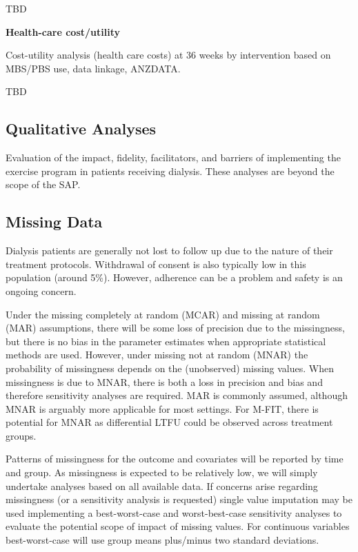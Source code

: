 \documentclass[
]{article}
\begin{document}
TBD

\textbf{Health-care cost/utility}

Cost-utility analysis (health care costs) at 36 weeks by intervention based on MBS/PBS use, data linkage, ANZDATA.

TBD



\hypertarget{qualitative-analyses}{%
  \subsection{Qualitative Analyses}\label{qualitative-analyses}}

Evaluation of the impact, fidelity, facilitators, and barriers of implementing the exercise program in patients receiving dialysis.
These analyses are beyond the scope of the SAP.

\hypertarget{missing-data}{%
  \subsection{Missing Data}\label{missing-data}}

Dialysis patients are generally not lost to follow up due to the nature of their treatment protocols.
Withdrawal of consent is also typically low in this population (around 5\%).
However, adherence can be a problem and safety is an ongoing concern.

Under the missing completely at random (MCAR) and missing at random (MAR) assumptions, there will be some loss of precision due to the missingness, but there is no bias in the parameter estimates when appropriate statistical methods are used.
However, under missing not at random (MNAR) the probability of missingness depends on the (unobserved) missing values.
When missingness is due to MNAR, there is both a loss in precision and bias and therefore sensitivity analyses are required.
MAR is commonly assumed, although MNAR is arguably more applicable for most settings.
For M-FIT, there is potential for MNAR as differential LTFU could be observed across treatment groups.

Patterns of missingness for the outcome and covariates will be reported by time and group.
As missingness is expected to be relatively low, we will simply undertake analyses based on all available data.
If concerns arise regarding missingness (or a sensitivity analysis is requested) single value imputation may be used implementing a best-worst-case and worst-best-case sensitivity analyses to evaluate the potential scope of impact of missing values.
For continuous variables best-worst-case will use group means plus/minus two standard deviations.
\end{document}
